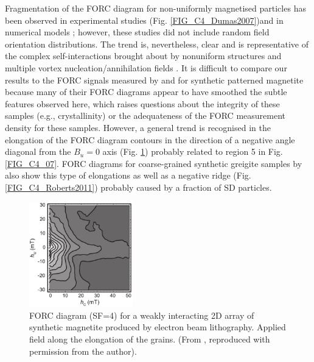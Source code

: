 Fragmentation of the FORC diagram for non-uniformly magnetised particles has been observed in experimental studies \citep{Pike1999B,Dumas2007,Roberts2017,Zhao2017} (Fig. \ref{FIG_C4_Dumas2007})and in numerical models \citep{Carvallo2003,Roberts2017}; however, these studies did not include random field orientation distributions. The trend is, nevertheless, clear and is representative of the complex self-interactions brought about by nonuniform structures and multiple vortex nucleation/annihilation fields \citep{Pike1999B}. It is difficult to compare our results to the FORC signals measured by \citet{Muxworthy2006B} and \citet{Krasa2011} for synthetic patterned magnetite because many of their FORC diagrams appear to have smoothed the subtle features observed here, which raises questions about the integrity of these samples (e.g., crystallinity) or the adequateness of the FORC measurement density for these samples. However, a general trend is recognised in the elongation of the FORC diagram contours in the direction of a negative angle diagonal from the $B_u=0$ axis (Fig. \ref{FIG_C4_Muxworthy2006B}) probably related to region 5 in Fig. \ref{FIG_C4_07}. FORC diagrams for coarse-grained synthetic greigite samples by \citet{Roberts2011} also show this type of elongations as well as a negative ridge (Fig. \ref{FIG_C4_Roberts2011}) probably caused by a fraction of SD particles.
\begin{figure}
\centering
\includegraphics[width=0.4\textwidth]{research-3/figs/Muxworthy2006B.pdf}
\caption[FORC diagram of a synthetic magnetite 2D array]{FORC diagram (SF=4) for a weakly interacting 2D array of synthetic magnetite produced by electron beam lithography. Applied field along the elongation of the grains. (From \citet{Muxworthy2006B}, reproduced with permission from the author).}
\label{FIG_C4_Muxworthy2006B}
\end{figure}\par

